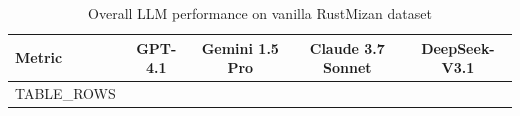 \begin{table}[htbp]
\centering
\caption{Overall LLM performance on vanilla RustMizan dataset}
\label{tab:vanilla_performance}
\begin{tabular}{lcccc}
\toprule
\textbf{Metric} & \textbf{GPT-4.1} & \textbf{Gemini 1.5 Pro} & \textbf{Claude 3.7 Sonnet} & \textbf{DeepSeek-V3.1} \\
\midrule
{TABLE_ROWS}
\bottomrule
\end{tabular}
\end{table}